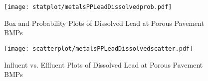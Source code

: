         \begin{figure}[hb]   %
            \centering
            \texttt{[image: statplot/metalsPPLeadDissolvedprob.pdf]}
            \caption{Box and Probability Plots of Dissolved Lead at Porous Pavement BMPs}
        \end{figure}         %
        
        
        \begin{figure}[hb]   %
            \centering
            \texttt{[image: scatterplot/metalsPPLeadDissolvedscatter.pdf]}
            \caption{Influent vs. Effluent Plots of Dissolved Lead at Porous Pavement BMPs}
        \end{figure}         %
        \clearpage
        